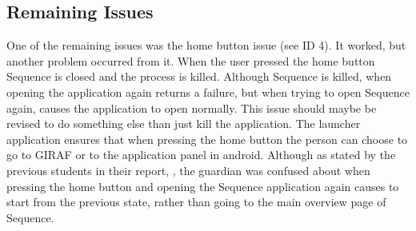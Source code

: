 \subsection{Remaining Issues}
One of the remaining issues was the home button issue (see ID 4). It worked, but another problem occurred from it. 
When the user pressed the home button Sequence is closed and the process is killed. Although Sequence is killed, when opening the application again returns a failure, but when trying to open Sequence again, causes the application to open normally.
This issue should maybe be revised to do something else than just kill the application.
The launcher application ensures that when pressing the home button the person can choose to go to GIRAF or to the application panel in android.
Although as stated by the previous students in their report, \citep{Zebra}, the guardian was confused about when pressing the home button and opening the Sequence application again causes to start from the previous state, rather than going to the main overview page of Sequence.